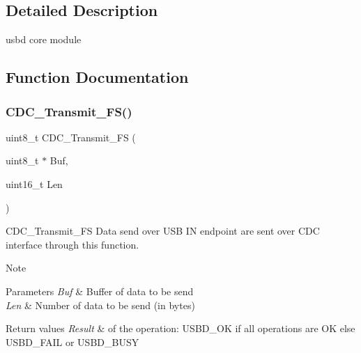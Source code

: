 \subsection{Detailed Description}
usbd core module 



\subsection{Function Documentation}
\hypertarget{group___u_s_b_d___c_d_c_ga5137d6201dbdef2bf351c5b4941c24f4}{}\label{group___u_s_b_d___c_d_c_ga5137d6201dbdef2bf351c5b4941c24f4} 
\subsubsection{\texorpdfstring{C\+D\+C\+\_\+\+Transmit\+\_\+\+F\+S()}{CDC\_Transmit\_FS()}}
{\footnotesize\ttfamily uint8\+\_\+t C\+D\+C\+\_\+\+Transmit\+\_\+\+FS (\begin{DoxyParamCaption}\item[{uint8\+\_\+t $\ast$}]{Buf,  }\item[{uint16\+\_\+t}]{Len }\end{DoxyParamCaption})}



C\+D\+C\+\_\+\+Transmit\+\_\+\+FS Data send over U\+SB IN endpoint are sent over C\+DC interface through this function. 

\begin{DoxyNote}{Note}

\end{DoxyNote}

\begin{DoxyParams}{Parameters}
{\em Buf} & Buffer of data to be send \\
\hline
{\em Len} & Number of data to be send (in bytes) \\
\hline
\end{DoxyParams}

\begin{DoxyRetVals}{Return values}
{\em Result} & of the operation\+: U\+S\+B\+D\+\_\+\+OK if all operations are OK else U\+S\+B\+D\+\_\+\+F\+A\+IL or U\+S\+B\+D\+\_\+\+B\+U\+SY \\
\hline
\end{DoxyRetVals}


